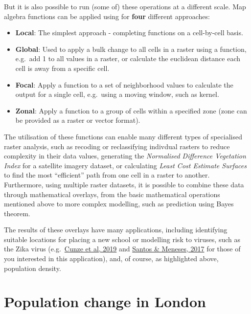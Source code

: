 \documentclass[
]{book}
\providecommand{\tightlist}{%
  \setlength{\itemsep}{0pt}\setlength{\parskip}{0pt}}
\begin{document}
But it is also possible to run (some of) these operations at a different scale. Map algebra functions can be applied using for \textbf{four} different approaches:

\begin{itemize}
\tightlist
\item
  \textbf{Local}: The simplest approach - completing functions on a cell-by-cell basis.
\item
  \textbf{Global}: Used to apply a bulk change to all cells in a raster using a function, e.g.~add 1 to all values in a raster, or calculate the euclidean distance each cell is away from a specific cell.
\item
  \textbf{Focal}: Apply a function to a set of neighborhood values to calculate the output for a single cell, e.g.~using a moving window, such as kernel.
\item
  \textbf{Zonal}: Apply a function to a group of cells within a specified zone (zone can be provided as a raster or vector format).
\end{itemize}

The utilisation of these functions can enable many different types of specialised raster analysis, such as recoding or reclassifying indivdual rasters to reduce complexity in their data values, generating the \emph{Normalised Difference Vegetation Index} for a satellite imagery dataset, or calculating \emph{Least Cost Estimate Surfaces} to find the most ``efficient'' path from one cell in a raster to another. Furthermore, using multiple raster datasets, it is possible to combine these data through mathematical overlays, from the basic mathematical operations mentioned above to more complex modelling, such as prediction using Bayes theorem.

The results of these overlays have many applications, including identifying suitable locations for placing a new school or modelling risk to viruses, such as the Zika virus (e.g.~\href{https://www.ncbi.nlm.nih.gov/pmc/articles/PMC6863140/}{Cunze et al, 2019} and \href{https://www.sciencedirect.com/science/article/pii/S0001706X16303886?casa_token=vJFKzU7IYf4AAAAA:LkKoIPdcLztD9qmWaDEUq56H3so9PPRXvgN8hy6IidqblVRJ1FWawqlGBKybvHhYYdfRY-DLadVi}{Santos \& Meneses, 2017} for those of you interested in this application), and, of course, as highlighted above, population density.

\hypertarget{population-change-in-london-1}{%
\section{Population change in London}\label{population-change-in-london-1}}
\end{document}
